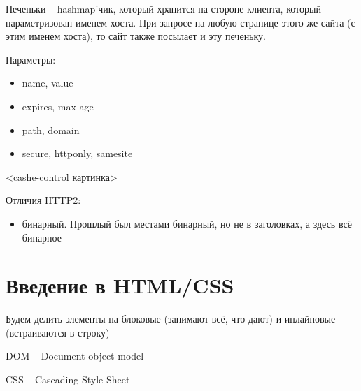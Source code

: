 \documentclass{book}
\theoremstyle{definition}
\begin{document}
    Печеньки -- hashmap'чик, который хранится на стороне клиента, который параметризован именем хоста. При запросе на любую странице этого же сайта (с этим именем хоста), то сайт также посылает и эту печеньку.

    Параметры:
    \begin{itemize}
        \item  name, value
        \item expires, max-age
        \item path, domain
        \item secure, httponly, samesite
    \end{itemize}

    <cashe-control картинка>

    Отличия HTTP2:
    \begin{itemize}
        \item бинарный. Прошлый был местами бинарный, но не в заголовках, а здесь всё бинарное
    \end{itemize}

    \section{Введение в HTML/CSS}


    Будем делить элементы на блоковые (занимают всё, что дают) и инлайновые (встраиваются в строку)

    \begin{definition}
        DOM -- Document object model

        CSS -- Cascading Style Sheet
    \end{definition}
\end{document}
